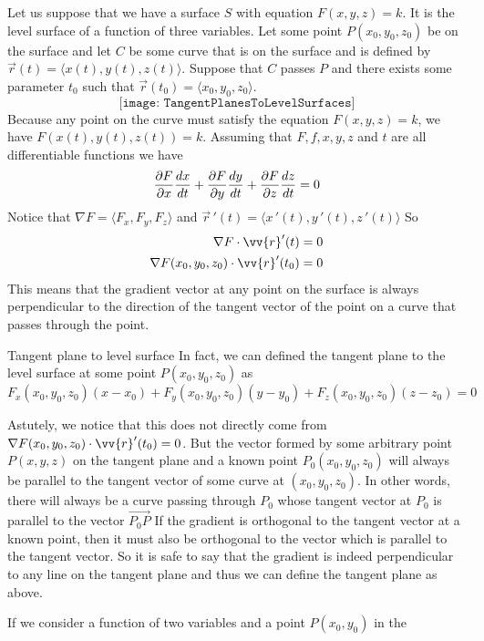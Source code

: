 \documentclass{article}
\begin{document}
	Let us suppose that we have a surface $S$ with equation $F(x,y,z) = k$. It is the
	level surface of a function of three variables. Let some point
	$P(x_{0},y_{0},z_{0})$ be on the surface and let $C$ be some curve that is on
	the surface and is defined by $\vec{r}(t)= \langle x(t),y(t),z(t) \rangle$. Suppose
	that $C$ passes $P$ and there exists some parameter $t_{0}$ such that $\vec{r}(
	t_{0})= \langle x_{0},y_{0},z_{0}\rangle$.
	\[
		\texttt{[image: TangentPlanesToLevelSurfaces]}
	\]
	Because any point on the curve must satisfy the equation $F(x,y,z) = k$, we have
	$F(x(t),y(t),z(t)) = k$. Assuming that $F, f, x,y,z$ and $t$ are all
	differentiable functions we have
	\[
		\pdv{F}{x}\frac{dx}{dt}+\pdv{F}{y}\frac{dy}{dt}+ \pdv{F}{z}\frac{dz}{dt}= 0
	\]
	Notice that $\nabla F = \langle F_{x},F_{y},F_{z} \rangle$ and
	$\vec{r}\,'(t)= \langle x\,'(t),y\,'(t),z\,'(t) \rangle$ So
	\begin{align*}
		\nabla F \cdot \vv{r}'(t)                        & = 0 \\
		\nabla F(x_{0},y_{0},z_{0}) \cdot \vv{r}'(t_{0}) & = 0
	\end{align*}
	This means that the gradient vector at any point on the surface is always
	perpendicular to the direction of the tangent vector of the point on a curve
	that passes through the point.
	\begin{mybox}
		{Tangent plane to level surface} In fact, we can defined the tangent plane
		to the level surface at some point $P(x_{0},y_{0},z_{0})$ as
		\[
			F_{x}(x_{0},y_{0},z_{0})(x-x_{0}) + F_{y}(x_{0},y_{0},z_{0})(y-y_{0}) + F_{z}
			(x_{0},y_{0},z_{0})(z-z_{0}) = 0
		\]

		Astutely, we notice that this does not directly come from
		$\nabla F(x_{0},y_{0},z_{0}) \cdot \vv{r}'(t_{0}) = 0$. But the vector formed
		by some arbitrary point $P(x,y,z)$ on the tangent plane and a known point $P_{0}
		(x_{0},y_{0},z_{0})$ will always be parallel to the tangent vector of some curve
		at $(x_{0},y_{0},z_{0})$. In other words, there will always be a curve passing
		through $P_{0}$ whose tangent vector at $P_{0}$ is parallel to the vector $\overrightarrow
		{P_0P}$ If the gradient is orthogonal to the tangent vector at a known point,
		then it must also be orthogonal to the vector which is parallel to the
		tangent vector. So it is safe to say that the gradient is indeed perpendicular
		to any line on the tangent plane and thus we can define the tangent plane as
		above.
	\end{mybox}
	If we consider a function of two variables and a point $P(x_{0},y_{0})$ in the
\end{document}
